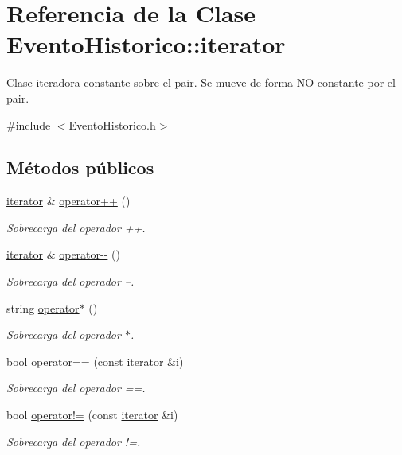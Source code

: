 \hypertarget{classEventoHistorico_1_1iterator}{}\section{Referencia de la Clase Evento\+Historico\+:\+:iterator}
\label{classEventoHistorico_1_1iterator}


Clase iteradora constante sobre el pair. Se mueve de forma NO constante por el pair.  




{\ttfamily \#include $<$Evento\+Historico.\+h$>$}

\subsection*{Métodos públicos}
\begin{DoxyCompactItemize}
\item 
\hyperlink{classEventoHistorico_1_1iterator}{iterator} \& \hyperlink{classEventoHistorico_1_1iterator_afd7e698045c436ee93d1e357b6829b00}{operator++} ()
\begin{DoxyCompactList}\small\item\em Sobrecarga del operador ++. \end{DoxyCompactList}\item 
\hyperlink{classEventoHistorico_1_1iterator}{iterator} \& \hyperlink{classEventoHistorico_1_1iterator_ada20b15309344487ed25239542608439}{operator-\/-\/} ()
\begin{DoxyCompactList}\small\item\em Sobrecarga del operador --. \end{DoxyCompactList}\item 
string \hyperlink{classEventoHistorico_1_1iterator_a0423c1e5d9bebd288442940bef5ed762}{operator$\ast$} ()
\begin{DoxyCompactList}\small\item\em Sobrecarga del operador $\ast$. \end{DoxyCompactList}\item 
bool \hyperlink{classEventoHistorico_1_1iterator_ad1388fb2b648f289a2120416a6a922d0}{operator==} (const \hyperlink{classEventoHistorico_1_1iterator}{iterator} \&i)
\begin{DoxyCompactList}\small\item\em Sobrecarga del operador ==. \end{DoxyCompactList}\item 
bool \hyperlink{classEventoHistorico_1_1iterator_a1c4c3aa8c2df796c3bbacfe108b628a9}{operator!=} (const \hyperlink{classEventoHistorico_1_1iterator}{iterator} \&i)
\begin{DoxyCompactList}\small\item\em Sobrecarga del operador !=. \end{DoxyCompactList}\end{DoxyCompactItemize}
